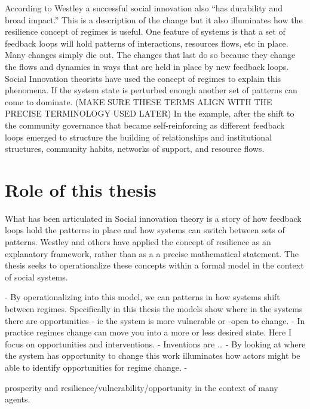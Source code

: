 According to Westley a successful social innovation also ``has durability and broad impact.'' This is a description of the change but it also illuminates how the resilience concept of regimes is useful. One feature of systems is that a set of feedback loops will hold patterns of interactions, resources flows, etc in place. Many changes simply die out.  The changes that last do so because they change the flows and dynamics in ways that are held in place by new feedback loops.  Social Innovation theorists have used the concept of regimes to explain this phenomena. If the system state is perturbed enough another set of patterns can come to dominate.  (MAKE SURE THESE TERMS ALIGN WITH THE PRECISE TERMINOLOGY USED LATER) In the example, after the shift to the community governance that became self-reinforcing as different feedback loops emerged to structure the building of relationships and institutional structures, community habits, networks of support, and resource flows. 

\section{Role of this thesis}

What has been articulated in Social innovation theory is a story of how feedback loops hold the patterns in place  and how systems can switch between sets of patterns. Westley and others have applied the concept of resilience as an explanatory framework, rather than as a a precise mathematical statement. 
The thesis seeks to operationalize these concepts within a formal model in the context of social systems. 


- By operationalizing into this model, we can patterns in how systems shift between regimes. Specifically in this thesis the models show where in the systems there are opportunities - ie the system is more vulnerable or -open to change. 
- In practice regimes change can move you into a more or less desired state. Here I focus on opportunities and interventions. 
- Inventions are \dots
- By looking at where the system has opportunity to change this work illuminates how actors might be able to identify opportunities for regime change. 
- 




prosperity and resilience/vulnerability/opportunity in the context of many agents.











